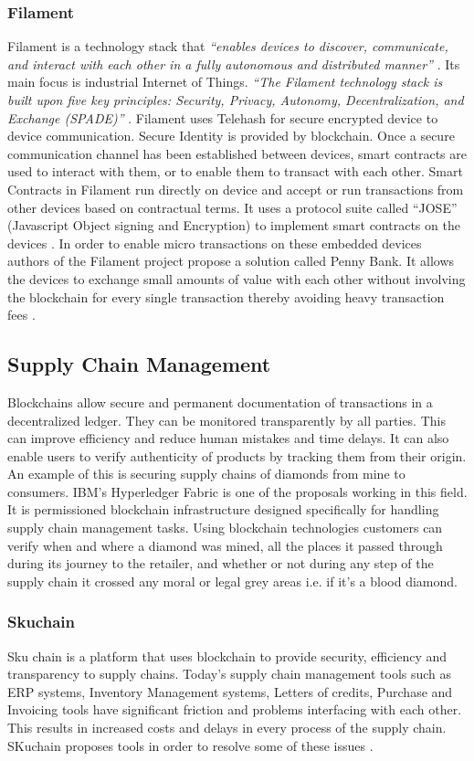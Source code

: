\subsubsection{Filament} \label{Filament}
Filament is a technology stack that \textit{“enables devices to discover, communicate, and interact with each other in a fully autonomous and distributed manner”} \cite{misc:006}. Its main focus is industrial Internet of Things. \textit{“The Filament technology stack is built upon five key principles: Security, Privacy, Autonomy, Decentralization, and Exchange (SPADE)”} \cite{misc:006}. Filament uses Telehash for secure encrypted device to device communication. Secure Identity is provided by blockchain. Once a secure communication channel has been established between devices, smart contracts are used to interact with them, or to enable them to transact with each other. Smart Contracts in Filament run directly on device and accept or run transactions from other devices based on contractual terms. It uses a protocol suite called “JOSE” (Javascript Object signing and Encryption) to implement smart contracts on the devices \cite{misc:007}. In order to enable micro transactions on these embedded devices authors of the Filament project propose a solution called Penny Bank. It allows the devices to exchange small amounts of value with each other without involving the blockchain for every single transaction thereby avoiding heavy transaction fees \cite{misc:006}.

\subsection{Supply Chain Management}
Blockchains allow secure and permanent documentation of transactions in a decentralized ledger. They can be monitored transparently by all parties. This can improve efficiency and reduce human mistakes and time delays. It can also enable users to verify authenticity of products by tracking them from their origin. An example of this is securing supply chains of diamonds from mine to consumers. IBM’s Hyperledger Fabric is one of the proposals working in this field. It is permissioned blockchain infrastructure designed specifically for handling supply chain management tasks. Using blockchain technologies customers can verify when and where a diamond was mined, all the places it passed through during its journey to the retailer, and whether or not during any step of the supply chain it crossed any moral or legal grey areas i.e. if it’s a blood diamond.
\subsubsection{Skuchain}
Sku chain is a platform that uses blockchain to provide security, efficiency and transparency to supply chains. Today’s supply chain management tools such as ERP systems, Inventory Management systems, Letters of credits, Purchase and Invoicing tools have significant friction and problems interfacing with each other. This results in increased costs and delays in every process of the supply chain. SKuchain proposes tools in order to resolve some of these issues \cite{misc:015}.

